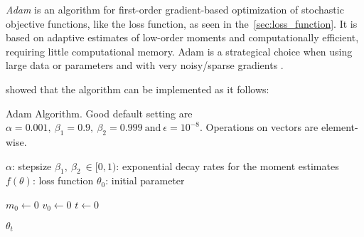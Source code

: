 \emph{Adam} is an algorithm for first-order gradient-based optimization of stochastic objective functions, like the loss function, as seen in the~\cref{sec:loss_function}.
It is based on adaptive estimates of low-order moments and computationally efficient, requiring little computational memory.
Adam is a strategical choice when using large data or parameters and with very noisy/sparse gradients \citep{kingma2017}.

\citet{kingma2017} showed that the algorithm can be implemented as it follows:

\begin{algorithm}[!htb]
\caption[Adam Algorithm]{Adam Algorithm. Good default setting are \(\alpha = 0.001,\ \beta_1 = 0.9,\ \beta_2 = 0.999\ \text{and}\ \epsilon = 10^{-8}\). Operations on vectors are element-wise.}
\begin{algorithmic}
\Require \(\alpha\): stepsize
\Require \(\beta_1,\ \beta_2\ \in [0,1)\): exponential decay rates for the moment estimates
\Require \(f(\theta)\): loss function
\Require \(\theta_0\): initial parameter

\State \(m_0 \gets 0\)
\State \(v_0 \gets 0\)
\State \(t \gets 0\)
\EndWhile

\Return \(\theta_t\)
\end{algorithmic}
\end{algorithm}



